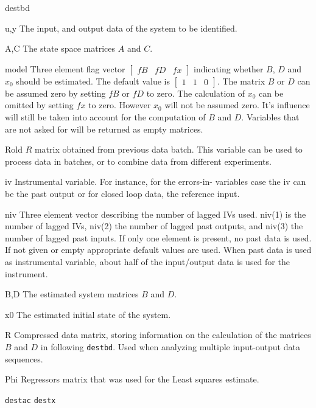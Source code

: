\documentclass{book}
\newcommand{\mat}[2]{\left[\begin{array}{#1}#2\end{array}\right]}
\newcommand{\destbd}{\texttt{destbd}}
\newcommand{\destx}{\texttt{destx}}
\newcommand{\destac}{\texttt{destac}}
\begin{document}
\begin{command}{destbd}
  \begin{inputs}
\item[u,y] The input, and output data of the system to be identified.
\item[A,C] The state space matrices $A$ and $C$.
\item[model] Three element flag vector $\mat{ccc}{fB& fD& fx}$
  indicating whether $B$, $D$ and $x_0$ should be estimated. The
  default value is $\mat{ccc}{1&1&0}$.  The matrix $B$ or $D$ can
  be assumed zero by setting $fB$ or $fD$ to zero. The calculation of
  $x_0$ can be omitted by setting $fx$ to zero. However $x_0$ will not
  be assumed zero.  It's influence will still be taken into account
  for the computation of $B$ and $D$. Variables that are not asked
  for will be returned as empty matrices.
\item[Rold] $R$ matrix obtained from previous data batch. This variable
  can be used to process data in batches, or to combine data from
  different experiments.
\item[iv] Instrumental variable. For instance, for the errors-in-
  variables case the iv can be the past output or for closed loop
  data, the reference input.
\item[niv] Three element vector describing the number of lagged IVs
  used. niv(1) is the number of lagged IVs, niv(2) the number
  of lagged past outputs, and niv(3) the number of lagged past
  inputs. If only one element is present, no past data is
  used. If not given or empty appropriate default values are used.
  When past data is used as instrumental variable, about half
  of the input/output data is used for the instrument.
\end{inputs}
\begin{outputs}
\item[B,D] The estimated system matrices $B$ and $D$.
\item[x0] The estimated initial state of the system.
\item[R] Compressed data matrix,  storing information on the calculation of
  the  matrices $B$ and $D$ in following {\destbd}. Used when analyzing
  multiple input-output data sequences.  
\item[Phi] Regressors matrix that was used for the Least squares estimate.
\end{outputs}
\begin{seealso}
  {\destac} {\destx}
\end{seealso}
\end{command}%
\end{document}
